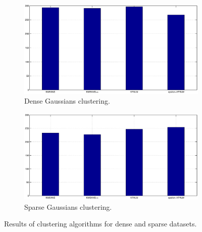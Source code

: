\begin{figure}
    \centering
    \begin{subfigure}[b]{0.45\textwidth}
        \includegraphics[width=\textwidth]{dense_gaussians_similarity}
        \caption{Dense Gaussians clustering.}
        \label{fig:dense_gaussians_similarity}
    \end{subfigure}
    \quad
    \begin{subfigure}[b]{0.45\textwidth}
        \includegraphics[width=\textwidth]{sparse_gaussians_similarity}
        \caption{Sparse Gaussians clustering.}
        \label{fig:sparse_gaussians_similarity}
    \end{subfigure}
    \caption{Results of clustering algorithms for dense and sparse datasets.}
    \label{fig:gaussians_similarity}
\end{figure}

